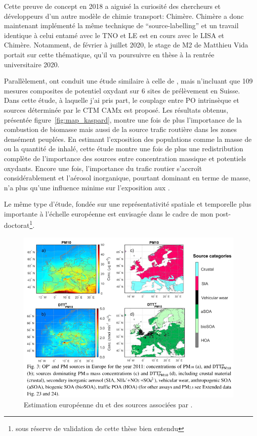 Cette preuve de concept en 2018 a aiguisé la curiosité des chercheurs et développeurs
d'un autre modèle de chimie transport: Chimère. Chimère a donc maintenant implémenté la
même technique de ``source-labelling'' et un travail identique à celui entamé avec le
TNO et LE est en cours avec le LISA et Chimère. Notamment, de février à juillet 2020, le
stage de M2 de Matthieu Vida portait sur cette thématique, qu'il va poursuivre en thèse à
la rentrée universitaire 2020.

Parallèlement, \cite{daellenbachSourcessubmitted} ont conduit une étude similaire à celle
de \cite{weberSourceinprep.}, mais n'incluant que 109 mesures composites de potentiel
oxydant sur 6 sites de prélèvement en Suisse. Dans cette étude, à laquelle j'ai pris
part, le couplage entre PO intrinsèque et sources déterminée par le CTM CAMx est proposé.
Les résultats obtenus, présentée figure~\ref{fig:map_kaspard}, montre une fois de plus
l'importance de la combustion de biomasse mais aussi de la source trafic routière dans
les zones densément peuplées. En estimant l'exposition des populations comme la masse de
\PMdix{} ou la quantité de \POv{} inhalé, cette étude montre une fois de plus une
redistribution complète de l'importance des sources entre concentration massique et
potentiels oxydants. Encore une fois, l'importance du trafic routier s'accroît
considérablement et l'aérosol inorganique, pourtant dominant en terme de masse, n'a plus
qu'une influence minime sur l'exposition aux \POv.

Le même type d'étude, fondée sur une représentativité spatiale et temporelle plus
importante à l'échelle européenne est envisagée dans le cadre de mon
post-doctorat\footnote{sous réserve de validation de cette thèse bien entendu}.

\begin{figure}[ht]
    \centering
    \includegraphics[width=0.8\linewidth]{figures/chapter05/map_kaspard.png}
    \caption{Estimation européenne du \PODTTv{} et des sources associées par
    \cite{daellenbachSourcessubmitted}.}%
    \label{fig:figures/chapter05/map_kaspard}
\end{figure}

